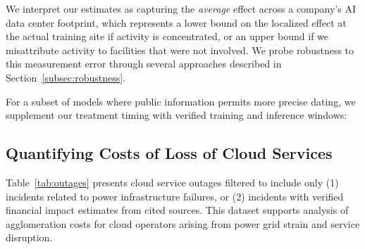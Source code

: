 \documentclass[sigconf]{acmart}
\begin{document}
We interpret our estimates as capturing the \textit{average} effect across a company's AI data center footprint, which represents a lower bound on the localized effect at the actual training site if activity is concentrated, or an upper bound if we misattribute activity to facilities that were not involved. We probe robustness to this measurement error through several approaches described in Section~\ref{subsec:robustness}.

For a subset of models where public information permits more precise dating, we supplement our treatment timing with verified training and inference windows:

\subsection{Quantifying Costs of Loss of Cloud Services}\label{app:outage_costs}

Table~\ref{tab:outages} presents cloud service outages filtered to include only (1) incidents related to power infrastructure failures, or (2) incidents with verified financial impact estimates from cited sources. This dataset supports analysis of agglomeration costs for cloud operators arising from power grid strain and service disruption.
\end{document}
